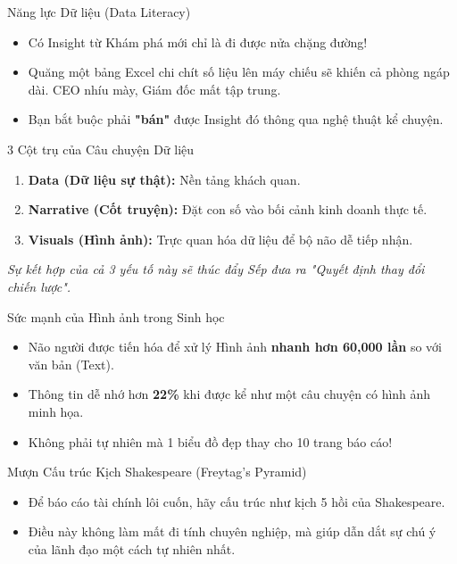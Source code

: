 \documentclass[aspectratio=169,12pt]{beamer}
\begin{document}
\begin{frame}{Năng lực Dữ liệu (Data Literacy)}
    \begin{itemize}
        \item Có Insight từ Khám phá mới chỉ là đi được nửa chặng đường!
        \item Quăng một bảng Excel chi chít số liệu lên máy chiếu sẽ khiến cả phòng ngáp dài. CEO nhíu mày, Giám đốc mất tập trung.
        \item Bạn bắt buộc phải \textbf{"bán"} được Insight đó thông qua nghệ thuật kể chuyện.
    \end{itemize}
\end{frame}

\begin{frame}{3 Cột trụ của Câu chuyện Dữ liệu}
    \begin{enumerate}
        \item \textbf{Data (Dữ liệu sự thật):} Nền tảng khách quan.
        \item \textbf{Narrative (Cốt truyện):} Đặt con số vào bối cảnh kinh doanh thực tế.
        \item \textbf{Visuals (Hình ảnh):} Trực quan hóa dữ liệu để bộ não dễ tiếp nhận.
    \end{enumerate}
    \vspace{0.3cm}
    \textit{Sự kết hợp của cả 3 yếu tố này sẽ thúc đẩy Sếp đưa ra "Quyết định thay đổi chiến lược".}
\end{frame}

\begin{frame}{Sức mạnh của Hình ảnh trong Sinh học}
    \begin{itemize}
        \item Não người được tiến hóa để xử lý Hình ảnh \textbf{nhanh hơn 60,000 lần} so với văn bản (Text).
        \item Thông tin dễ nhớ hơn \textbf{22\%} khi được kể như một câu chuyện có hình ảnh minh họa.
        \item Không phải tự nhiên mà 1 biểu đồ đẹp thay cho 10 trang báo cáo!
    \end{itemize}
\end{frame}

\begin{frame}{Mượn Cấu trúc Kịch Shakespeare (Freytag's Pyramid)}
    \begin{itemize}
        \item Để báo cáo tài chính lôi cuốn, hãy cấu trúc như kịch 5 hồi của Shakespeare.
        \item Điều này không làm mất đi tính chuyên nghiệp, mà giúp dẫn dắt sự chú ý của lãnh đạo một cách tự nhiên nhất.
    \end{itemize}
\end{frame}
\end{document}
